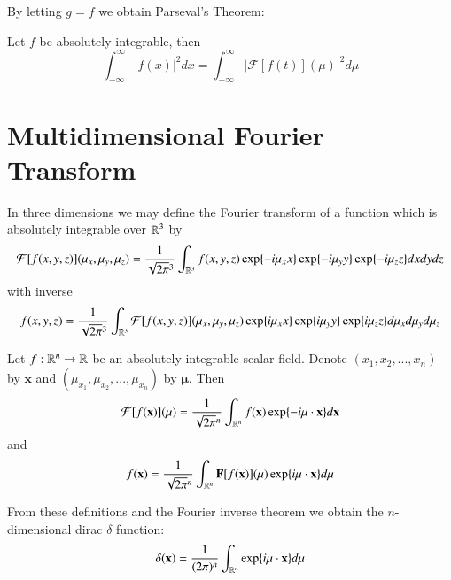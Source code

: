 \documentclass[12pt, a4paper, oneside, openright, titlepage]{book}
\begin{document}
By letting $g = f$ we obtain Parseval's Theorem: 

\begin{namthm}
    Let $f$ be absolutely integrable, then \begin{equation}
        \int_{-\infty}^{\infty}|f(x)|^2dx = \int_{-\infty}^{\infty}|\mathcal{F}[f(t)](\mu)|^2d\mu
    \end{equation}
\end{namthm}

\section{Multidimensional Fourier Transform}

\begin{defn}
    In three dimensions we may define the Fourier transform of a function which is absolutely integrable over $\mathbb R^3$ by \begin{equation}
        \mathcal{F}[f(x,y,z)](\mu_x,\mu_y,\mu_z) = \frac{1}{\sqrt{2\pi}^3}\int_{\mathbb R^3}f(x,y,z)\exp\{-i\mu_xx\}\exp\{-i\mu_yy\}\exp\{-i\mu_zz\}dxdydz
    \end{equation}
    with inverse \begin{equation}
        f(x,y,z) = \frac{1}{\sqrt{2\pi}^3}\int_{\mathbb R^3}\mathcal{F}[f(x,y,z)](\mu_x,\mu_y,\mu_z)\exp\{i\mu_xx\}\exp\{i\mu_yy\}\exp\{i\mu_zz\}d\mu_xd\mu_yd\mu_z
    \end{equation}
\end{defn}

\begin{defn}
    Let $f:\mathbb R^n\rightarrow \mathbb R$ be an absolutely integrable scalar field. Denote $(x_1,x_2,...,x_n)$ by $\mathbf{x}$ and $(\mu_{x_1},\mu_{x_2},...,\mu_{x_n})$ by $\mathbf{\mu}$. Then \begin{equation}
        \mathcal{F}[f(\mathbf{x})](\mathbf{\mu}) = \frac{1}{\sqrt{2\pi}^n}\int_{\mathbb R^n}f(\mathbf{x})\exp\{-i\mathbf{\mu}\cdot \mathbf{x}\}d\mathbf{x}
    \end{equation}
    and \begin{equation}
        f(\mathbf{x}) = \frac{1}{\sqrt{2\pi}^n}\int_{\mathbb R^n}\mathbf{F}[f(\mathbf{x})](\mathbf{\mu})\exp\{i\mathbf{\mu}\cdot\mathbf{x}\}d\mathbf{\mu}
    \end{equation}
\end{defn}

From these definitions and the Fourier inverse theorem we obtain the $n$-dimensional dirac $\delta$ function: \begin{equation}
    \delta(\mathbf{x}) = \frac{1}{(2\pi)^n}\int_{\mathbb R^n}\exp\{i\mathbf{\mu}\cdot \mathbf{x}\}d\mathbf{\mu}
\end{equation}
\end{document}

